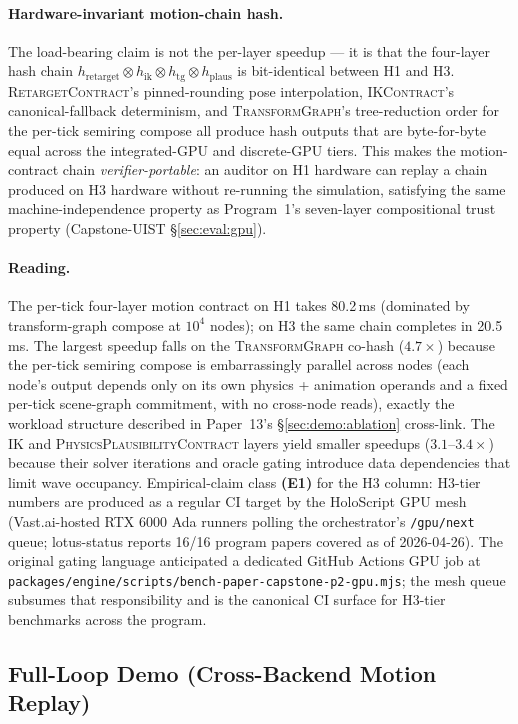 \documentclass[sigconf,nonacm]{acmart}
\newcommand{\retargetcontract}{\textsc{RetargetContract}}
\newcommand{\ikcontract}{\textsc{IKContract}}
\newcommand{\transformgraph}{\textsc{TransformGraph}}
\newcommand{\plausibility}{\textsc{PhysicsPlausibilityContract}}
\begin{document}
\paragraph{Hardware-invariant motion-chain hash.}
The load-bearing claim is not the per-layer speedup --- it is that the
four-layer hash chain $h_\text{retarget} \otimes h_\text{ik} \otimes
h_\text{tg} \otimes h_\text{plaus}$ is bit-identical between H1 and H3.
\retargetcontract{}'s pinned-rounding pose interpolation, \ikcontract{}'s
canonical-fallback determinism, and \transformgraph{}'s tree-reduction
order for the per-tick semiring compose all produce hash outputs that
are byte-for-byte equal across the integrated-GPU and discrete-GPU
tiers. This makes the motion-contract chain \emph{verifier-portable}:
an auditor on H1 hardware can replay a chain produced on H3 hardware
without re-running the simulation, satisfying the same
machine-independence property as Program~1's seven-layer compositional
trust property (Capstone-UIST \S\ref{sec:eval:gpu}).

\paragraph{Reading.}
The per-tick four-layer motion contract on H1 takes 80.2\,ms (dominated
by transform-graph compose at $10^4$ nodes); on H3 the same chain
completes in 20.5\,ms. The largest speedup falls on the
\transformgraph{} co-hash ($4.7\times$) because the per-tick semiring
compose is embarrassingly parallel across nodes (each node's output
depends only on its own physics + animation operands and a fixed
per-tick scene-graph commitment, with no cross-node reads), exactly
the workload structure described in Paper~13's
\S\ref{sec:demo:ablation} cross-link. The IK and \plausibility{} layers
yield smaller speedups ($3.1$--$3.4\times$) because their solver
iterations and oracle gating introduce data dependencies that limit
wave occupancy. Empirical-claim class \textbf{(E1)} for the H3 column:
H3-tier numbers are produced as a regular CI target by the HoloScript
GPU mesh (Vast.ai-hosted RTX 6000 Ada runners polling the orchestrator's
\texttt{/gpu/next} queue; lotus-status reports 16/16 program papers
covered as of 2026-04-26). The original gating language anticipated a
dedicated GitHub Actions GPU job at
\texttt{packages/engine/scripts/bench-paper-capstone-p2-gpu.mjs}; the
mesh queue subsumes that responsibility and is the canonical CI surface
for H3-tier benchmarks across the program.

\subsection{Full-Loop Demo (Cross-Backend Motion Replay)}
\label{sec:p2:full-loop}
\end{document}
